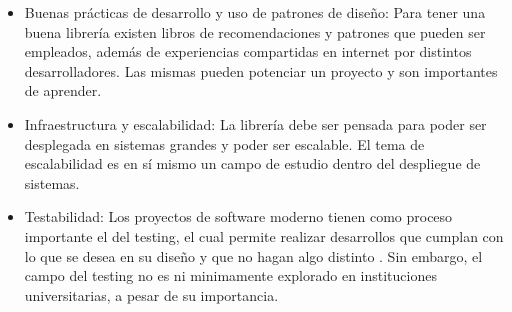 \begin{itemize}
    \item Buenas prácticas de desarrollo y uso de patrones de diseño: Para tener
          una buena librería existen libros de recomendaciones y patrones que
          pueden ser empleados, además de experiencias compartidas en internet por
          distintos desarrolladores.  Las mismas pueden potenciar un proyecto y
          son importantes de aprender.

    \item Infraestructura y escalabilidad: La librería debe ser pensada para
          poder ser desplegada en sistemas grandes y poder ser escalable. El tema
          de escalabilidad es en sí mismo un campo de estudio dentro del
          despliegue de sistemas.

    \item Testabilidad: Los proyectos de software moderno tienen como proceso
          importante el del testing, el cual permite realizar desarrollos que cumplan con
          lo que se desea en su diseño y que no hagan algo distinto \parencite{myersArtSoftwareTesting2012}.
          Sin embargo, el campo del testing no es ni minimamente explorado en
          instituciones universitarias, a pesar de su importancia.
\end{itemize}